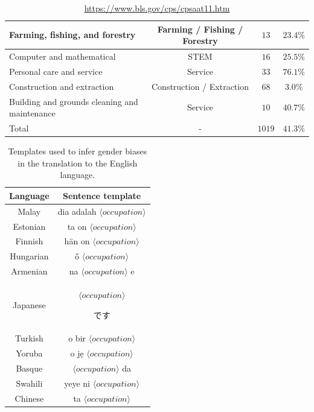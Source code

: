 \documentclass[fleqn,10pt]{article}
\begin{document}
\begin{table}[H]
\begin{small}
\begin{tabular}{|m{3.5cm}|c|c|c|}
	Farming, fishing, and forestry 					& Farming / Fishing / Forestry 	& $13$ 				& $23.4\%$				\\ \hline
	Computer and mathematical						& STEM 							& $16$ 				& $25.5\%$				\\ \hline
	Personal care and service						& Service 						& $33$ 				& $76.1\%$				\\ \hline
	Construction and extraction 					& Construction / Extraction 	& $68$ 				& $3.0\%$ 				\\ \hline
	Building and grounds cleaning and maintenance 	& Service 						& $10$ 				& $40.7\%$				\\ \hline \hline
	Total											& - 							& $1019$			& $41.3\%$				\\ \hline
	\end{tabular}
	\caption{\url{https://www.bls.gov/cps/cpsaat11.htm}}
	\label{tab:occupations}
	\end{small}
\end{table}

\begin{table}[H]
\small{
	\centering
	\begin{tabular}{|c|c|}
	\hline
	Language 	& Sentence template 						\\ \hline \hline
	Malay		& dia adalah $\langle occupation \rangle$ 	\\ \hline
	Estonian	& ta on $\langle occupation \rangle$ 		\\ \hline
	Finnish		& hän on $\langle occupation \rangle$ 		\\ \hline
	Hungarian	& ő $\langle occupation \rangle$ 			\\ \hline
	Armenian	& na $\langle occupation \rangle$ e 		\\ \hline
	Japanese	& $\langle occupation \rangle$ \begin{CJK*}{UTF8}{min}です\end{CJK*}			\\ \hline
	Turkish		& o bir $\langle occupation \rangle$ 		\\ \hline
	Yoruba		& o jẹ $\langle occupation \rangle$ 		\\ \hline
	Basque		& $\langle occupation \rangle$ da 			\\ \hline
	Swahili		& yeye ni $\langle occupation \rangle$ 		\\ \hline
	Chinese		& ta $\langle occupation \rangle$ 			\\ \hline
	\end{tabular}
	\caption{Templates used to infer gender biases in the translation to the English language.}
	\label{tab:templates}
	}
\end{table}
\end{document}
